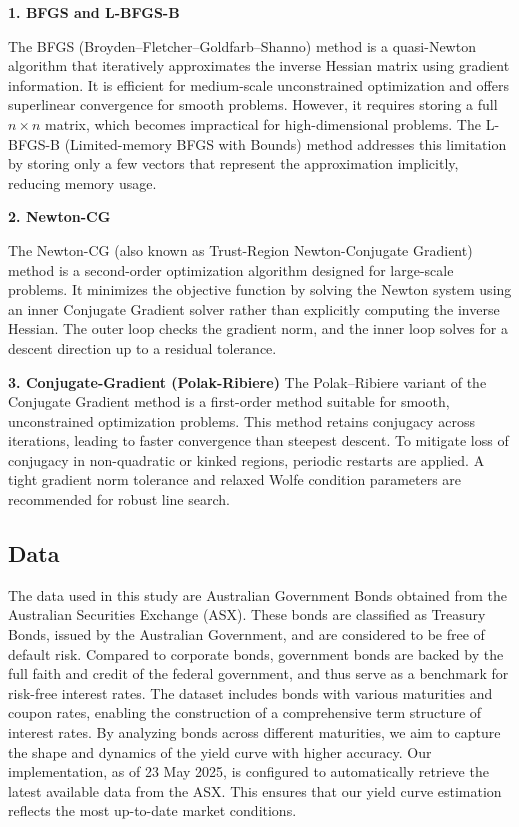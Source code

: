 \documentclass[12pt]{article}
\begin{document}
\textbf{1. BFGS and L-BFGS-B}

The BFGS (Broyden–Fletcher–Goldfarb–Shanno) method is a quasi-Newton algorithm that iteratively approximates the inverse Hessian matrix using gradient information. It is efficient for medium-scale unconstrained optimization and offers superlinear convergence for smooth problems. However, it requires storing a full \( n \times n \) matrix, which becomes impractical for high-dimensional problems. The L-BFGS-B (Limited-memory BFGS with Bounds) method addresses this limitation by storing only a few vectors that represent the approximation implicitly, reducing memory usage.

\textbf{2. Newton-CG }

The Newton-CG (also known as Trust-Region Newton-Conjugate Gradient) method is a second-order optimization algorithm designed for large-scale problems. It minimizes the objective function by solving the Newton system using an inner Conjugate Gradient solver rather than explicitly computing the inverse Hessian. The outer loop checks the gradient norm, and the inner loop solves for a descent direction up to a residual tolerance. 

\textbf{3. Conjugate-Gradient (Polak-Ribiere)}
The Polak–Ribiere variant of the Conjugate Gradient method is a first-order method suitable for smooth, unconstrained optimization problems. This method retains conjugacy across iterations, leading to faster convergence than steepest descent. To mitigate loss of conjugacy in non-quadratic or kinked regions, periodic restarts are applied. A tight gradient norm tolerance and relaxed Wolfe condition parameters are recommended for robust line search.

\subsection{Data}

The data used in this study are Australian Government Bonds obtained from the Australian Securities Exchange (ASX). These bonds are classified as Treasury Bonds, issued by the Australian Government, and are considered to be free of default risk. Compared to corporate bonds, government bonds are backed by the full faith and credit of the federal government, and thus serve as a benchmark for risk-free interest rates. The dataset includes bonds with various maturities and coupon rates, enabling the construction of a comprehensive term structure of interest rates. By analyzing bonds across different maturities, we aim to capture the shape and dynamics of the yield curve with higher accuracy. Our implementation, as of 23 May 2025, is configured to automatically retrieve the latest available data from the ASX. This ensures that our yield curve estimation reflects the most up-to-date market conditions.
\end{document}
